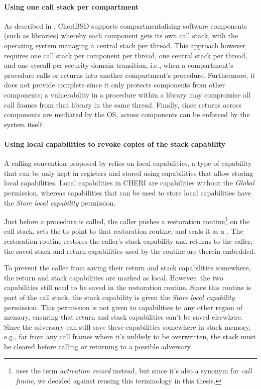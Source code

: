 \documentclass[main.tex]{subfiles}
\begin{document}
\paragraph{Using one call stack per compartment} As described in \cite{compartment}, CheriBSD supports compartmentalising software components (such as libraries) whereby each component gets its own call stack, with the operating system managing a central stack per thread. This approach however requires one call stack per component per thread, one central stack per thread, and one syscall per security domain transition, i.e., when a compartment's procedure calls or returns into another compartment's procedure. Furthermore, it does not provide complete  since it only protects components from other components; a vulnerability in a procedure within a library may compromise all call frames from that library in the same thread. Finally, since returns across components are mediated by the OS,  across components can be enforced by the system itself.

\paragraph{Using local capabilities to revoke copies of the stack capability} A calling convention proposed by \cite{retptr} relies on local capabilities, a type of capability that can be only kept in registers and stored using capabilities that allow storing local capabilities. Local capabilities in CHERI are capabilities without the \emph{Global} permission, whereas capabilities that can be used to store local capabilities have the \emph{Store local capability} permission.

Just before a procedure is called, the caller pushes a restoration routine\footnote{\cite{retptr} uses the term \emph{activation record} instead, but since it's also a synonym for \emph{call frame}, we decided against reusing this terminology in this thesis.} on the call stack, sets the  to point to that restoration routine, and seals it as a . The restoration routine restores the caller's stack capability and returns to the caller; the saved stack and return capabilities used by the routine are therein embedded.

To prevent the callee from saving their return and stack capabilities somewhere, the return and stack capabilities are marked as local. However, the two capabilities still need to be saved in the restoration routine. Since this routine is part of the call stack, the stack capability is given the \emph{Store local capability} permission. This permission is not given to capabilities to any other region of memory, ensuring that return and stack capabilities can't be saved elsewhere. Since the adversary can still save these capabilities somewhere in stack memory, e.g., far from any call frames where it's unlikely to be overwritten, the stack must be cleared before calling or returning to a possible adversary.
\end{document}
